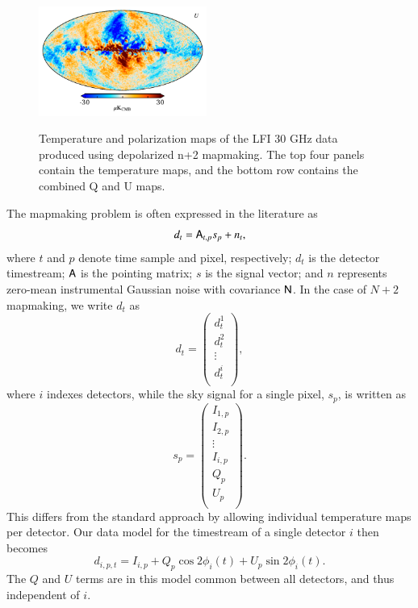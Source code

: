 \documentclass{aa}
\newcommand{\A}[0]{\tens{A}}
\newcommand{\N}[0]{\tens{N}}
\begin{document}
\begin{figure}[!]
  \includegraphics[width=0.49\textwidth]{figs/map_U_depol.pdf}\\
  \caption{Temperature and polarization maps of the LFI 30 GHz data produced using depolarized n+2 mapmaking. The top four panels contain the temperature maps, and the bottom row contains the combined Q and U maps.}
  \label{fig:depolarized}
\end{figure}

The mapmaking problem is often expressed in the literature as \citep[e.g.,][]{de_Gasperis_2005}
\begin{equation}
d_t = \A_{t,p}s_p + n_t,
\end{equation}
where $t$ and $p$ denote time sample and pixel, respectively; $d_t$ is the detector timestream; $\A$ is the pointing matrix; $s$ is the signal vector; and $n$ represents zero-mean instrumental Gaussian noise with covariance $\N$. In the case of $N+2$ mapmaking, we write $d_t$ as 
\begin{equation}
d_t = \begin{pmatrix}
d_t^1\\ d_t^2\\ \vdots \\ d_t^i\\
\end{pmatrix},
\end{equation}
where $i$ indexes detectors, while the sky signal for a single pixel, $s_p$, is written as
\begin{equation}
s_p = \begin{pmatrix}
I_{1,p}\\
I_{2,p}\\
\vdots\\
I_{i,p}\\
Q_p\\
U_p\\
\end{pmatrix}.
\end{equation}
This differs from the standard approach by allowing individual temperature maps per detector. Our data model for the timestream of a single detector $i$ then becomes
\begin{equation}
d_{i,p,t} = I_{i,p} + Q_p \cos2\phi_i(t) + U_p \sin2\phi_i(t).
\label{eq:datamodel}
\end{equation}
The $Q$ and $U$ terms are in this model common between all detectors, and thus independent of $i$.
\end{document}
